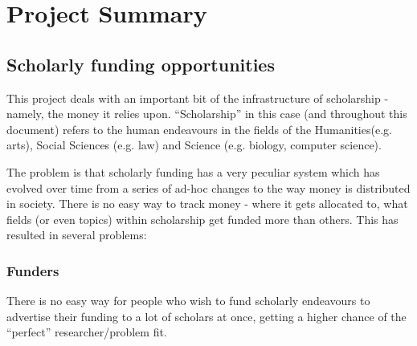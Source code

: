 \documentclass[11pt,fleqn,twoside]{article}
\begin{document}

\mmp

\setcounter{tocdepth}{3} %
\tableofcontents

\newpage

\section{Project Summary}


\subsection{Scholarly funding opportunities}
This project deals with an important bit of the infrastructure of scholarship - namely, the money it relies upon. ``Scholarship'' in this case (and throughout this document) refers to the human endeavours in the fields of the Humanities(e.g. arts), Social Sciences (e.g. law) and Science (e.g. biology, computer science).

The problem is that scholarly funding has a very peculiar system which has evolved over time from a series of ad-hoc changes to the way money is distributed in society. There is no easy way to track money - where it gets allocated to, what fields (or even topics) within scholarship get funded more than others. This has resulted in several problems:

\subsubsection{Funders}
There is no easy way for people who wish to fund scholarly endeavours to advertise their funding to a lot of scholars at once, getting a higher chance of the ``perfect'' researcher/problem fit.
\end{document}
